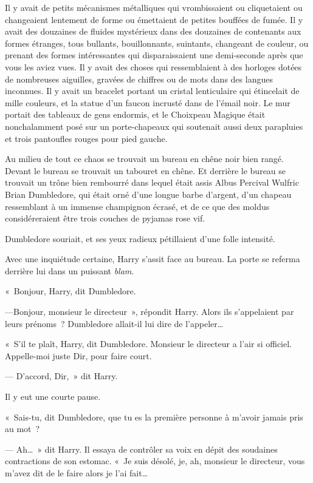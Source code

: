 Il y avait de petits mécanismes métalliques qui vrombissaient ou cliquetaient ou changeaient lentement de forme ou émettaient de petites bouffées de fumée. Il y avait des douzaines de fluides mystérieux dans des douzaines de contenants aux formes étranges, tous bullants, bouillonnants, suintants, changeant de couleur, ou prenant des formes intéressantes qui disparaissaient une demi-seconde après que vous les aviez vues. Il y avait des choses qui ressemblaient à des horloges dotées de nombreuses aiguilles, gravées de chiffres ou de mots dans des langues inconnues. Il y avait un bracelet portant un cristal lenticulaire qui étincelait de mille couleurs, et la statue d'un faucon incrusté dans de l'émail noir. Le mur portait des tableaux de gens endormis, et le Choixpeau Magique était nonchalamment posé sur un porte-chapeaux qui soutenait aussi deux parapluies et trois pantoufles rouges pour pied gauche.

Au milieu de tout ce chaos se trouvait un bureau en chêne noir bien rangé. Devant le bureau se trouvait un tabouret en chêne. Et derrière le bureau se trouvait un trône bien rembourré dans lequel était assis Albus Percival Wulfric Brian Dumbledore, qui était orné d'une longue barbe d'argent, d'un chapeau ressemblant à un immense champignon écrasé, et de ce que des moldus considéreraient être trois couches de pyjamas rose vif.

Dumbledore souriait, et ses yeux radieux pétillaient d'une folle intensité.

Avec une inquiétude certaine, Harry s'assit face au bureau. La porte se referma derrière lui dans un puissant \emph{blam}.

«~Bonjour, Harry, dit Dumbledore.

---Bonjour, monsieur le directeur~», répondit Harry. Alors ils s'appelaient par leurs prénoms~? Dumbledore allait-il lui dire de l'appeler…

«~S'il te plaît, Harry, dit Dumbledore. Monsieur le directeur a l'air si officiel. Appelle-moi juste Dir, pour faire court.

--- D'accord, Dir,~» dit Harry.

Il y eut une courte pause.

«~Sais-tu, dit Dumbledore, que tu es la première personne à m'avoir jamais pris au mot~?

--- Ah…~» dit Harry. Il essaya de contrôler sa voix en dépit des soudaines contractions de son estomac. «~Je suis désolé, je, ah, monsieur le directeur, vous m'avez dit de le faire alors je l'ai fait…

